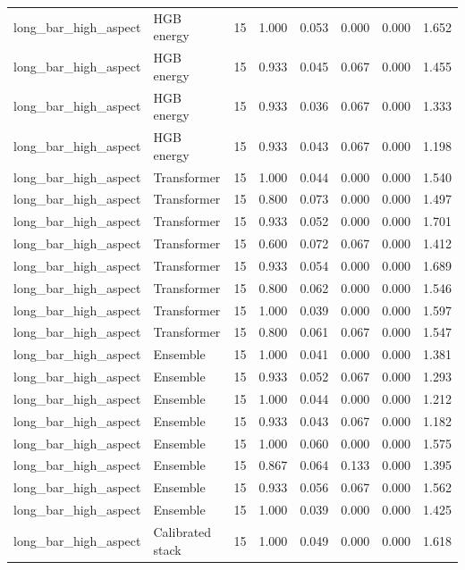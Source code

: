 {\begin{longtable}{llrrrrrr}
long\_bar\_high\_aspect & HGB energy & 15 & 1.000 & 0.053 & 0.000 & 0.000 & 1.652 \\
long\_bar\_high\_aspect & HGB energy & 15 & 0.933 & 0.045 & 0.067 & 0.000 & 1.455 \\
long\_bar\_high\_aspect & HGB energy & 15 & 0.933 & 0.036 & 0.067 & 0.000 & 1.333 \\
long\_bar\_high\_aspect & HGB energy & 15 & 0.933 & 0.043 & 0.067 & 0.000 & 1.198 \\
long\_bar\_high\_aspect & Transformer & 15 & 1.000 & 0.044 & 0.000 & 0.000 & 1.540 \\
long\_bar\_high\_aspect & Transformer & 15 & 0.800 & 0.073 & 0.000 & 0.000 & 1.497 \\
long\_bar\_high\_aspect & Transformer & 15 & 0.933 & 0.052 & 0.000 & 0.000 & 1.701 \\
long\_bar\_high\_aspect & Transformer & 15 & 0.600 & 0.072 & 0.067 & 0.000 & 1.412 \\
long\_bar\_high\_aspect & Transformer & 15 & 0.933 & 0.054 & 0.000 & 0.000 & 1.689 \\
long\_bar\_high\_aspect & Transformer & 15 & 0.800 & 0.062 & 0.000 & 0.000 & 1.546 \\
long\_bar\_high\_aspect & Transformer & 15 & 1.000 & 0.039 & 0.000 & 0.000 & 1.597 \\
long\_bar\_high\_aspect & Transformer & 15 & 0.800 & 0.061 & 0.067 & 0.000 & 1.547 \\
long\_bar\_high\_aspect & Ensemble & 15 & 1.000 & 0.041 & 0.000 & 0.000 & 1.381 \\
long\_bar\_high\_aspect & Ensemble & 15 & 0.933 & 0.052 & 0.067 & 0.000 & 1.293 \\
long\_bar\_high\_aspect & Ensemble & 15 & 1.000 & 0.044 & 0.000 & 0.000 & 1.212 \\
long\_bar\_high\_aspect & Ensemble & 15 & 0.933 & 0.043 & 0.067 & 0.000 & 1.182 \\
long\_bar\_high\_aspect & Ensemble & 15 & 1.000 & 0.060 & 0.000 & 0.000 & 1.575 \\
long\_bar\_high\_aspect & Ensemble & 15 & 0.867 & 0.064 & 0.133 & 0.000 & 1.395 \\
long\_bar\_high\_aspect & Ensemble & 15 & 0.933 & 0.056 & 0.067 & 0.000 & 1.562 \\
long\_bar\_high\_aspect & Ensemble & 15 & 1.000 & 0.039 & 0.000 & 0.000 & 1.425 \\
long\_bar\_high\_aspect & Calibrated stack & 15 & 1.000 & 0.049 & 0.000 & 0.000 & 1.618 \\

\end{longtable}}
